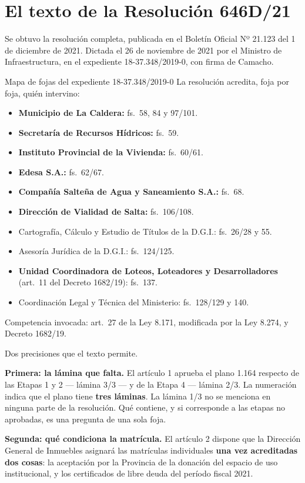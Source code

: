 \section{El texto de la Resolución 646D/21}

Se obtuvo la resolución completa, publicada en el Boletín Oficial Nº 21.123 del 1 de diciembre de 2021. Dictada el 26 de noviembre de 2021 por el Ministro de Infraestructura, en el expediente 18-37.348/2019-0, con firma de Camacho.

\begin{ficha}{Mapa de fojas del expediente 18-37.348/2019-0}
La resolución acredita, foja por foja, quién intervino:
\begin{itemize}[leftmargin=*,nosep]
\item \textbf{Municipio de La Caldera:} fs.\ 58, 84 y 97/101.
\item \textbf{Secretaría de Recursos Hídricos:} fs.\ 59.
\item \textbf{Instituto Provincial de la Vivienda:} fs.\ 60/61.
\item \textbf{Edesa S.A.:} fs.\ 62/67.
\item \textbf{Compañía Salteña de Agua y Saneamiento S.A.:} fs.\ 68.
\item \textbf{Dirección de Vialidad de Salta:} fs.\ 106/108.
\item Cartografía, Cálculo y Estudio de Títulos de la D.G.I.: fs.\ 26/28 y 55.
\item Asesoría Jurídica de la D.G.I.: fs.\ 124/125.
\item \textbf{Unidad Coordinadora de Loteos, Loteadores y Desarrolladores} (art.\ 11 del Decreto 1682/19): fs.\ 137.
\item Coordinación Legal y Técnica del Ministerio: fs.\ 128/129 y 140.
\end{itemize}
Competencia invocada: art.\ 27 de la Ley 8.171, modificada por la Ley 8.274, y Decreto 1682/19.
\end{ficha}

Dos precisiones que el texto permite.

\textbf{Primera: la lámina que falta.} El artículo 1 aprueba el plano 1.164 respecto de las Etapas 1 y 2 --- lámina 3/3 --- y de la Etapa 4 --- lámina 2/3. La numeración indica que el plano tiene \textbf{tres láminas}. La lámina 1/3 no se menciona en ninguna parte de la resolución. Qué contiene, y si corresponde a las etapas no aprobadas, es una pregunta de una sola foja.

\textbf{Segunda: qué condiciona la matrícula.} El artículo 2 dispone que la Dirección General de Inmuebles asignará las matrículas individuales \textbf{una vez acreditadas dos cosas}: la aceptación por la Provincia de la donación del espacio de uso institucional, y los certificados de libre deuda del período fiscal 2021.

